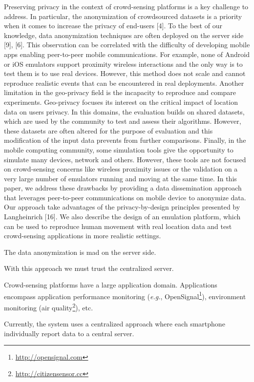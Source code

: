 %
Preserving privacy in the context of crowd-sensing platforms is a key challenge to address.
In particular, the anonymization of crowdsourced datasets is a priority when it comes to increase the privacy of end-users [4]. To the best of our knowledge, data anonymization techniques are often deployed on the server side [9], [6]. 
This observation can be correlated with the difficulty of developing mobile apps enabling peer-to-peer mobile communications. 
For example, none of Android or iOS emulators support proximity wireless interactions and the only
way is to test them is to use real devices. 
However, this method does not scale and cannot reproduce realistic events that can be encountered in real deployments. 
Another limitation in the geo-privacy field is the incapacity to reproduce and compare experiments. Geo-privacy focuses its interest on the critical impact of location data on users privacy. 
In this domains, the evaluation builds on shared datasets, which are used by the community to test
and assess their algorithms. However, these datasets are often altered for the purpose of evaluation and this modification of the input data prevents from further comparisons.
Finally, in the mobile computing community, some simulation tools give the opportunity to simulate many devices, network and others. However, these tools are not focused on crowd-sensing concerns like wireless proximity issues or the validation on a very large number of emulators running
and moving at the same time.
In this paper, we address these drawbacks by providing a data dissemination approach that leverages peer-to-peer communications on mobile device to anonymize data. 
Our approach take advantages of the privacy-by-design principles presented by Langheinrich [16].
We also describe the design of an emulation platform, which can be used to reproduce human movement with real location data and test crowd-sensing applications in more realistic settings.
%




The data anonymization is mad on the server side.

With this approach we must trust the centralized server.


Crowd-sensing platforms have a large application domain.
Applications encompass application performance monitoring (\emph{e.g.}, OpenSignal\footnote{\url{http://opensignal.com}}), environment monitoring (air quality\footnote{\url{http://citizensensor.cc}}), etc.


Currently, the system uses a centralized approach where each smartphone individually report data to a central server.

